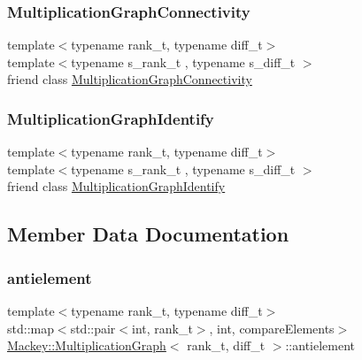 \subsubsection{\texorpdfstring{Multiplication\+Graph\+Connectivity}{MultiplicationGraphConnectivity}}
{\footnotesize\ttfamily template$<$typename rank\+\_\+t, typename diff\+\_\+t$>$ \\
template$<$typename s\+\_\+rank\+\_\+t , typename s\+\_\+diff\+\_\+t $>$ \\
friend class \hyperlink{classMackey_1_1MultiplicationGraphConnectivity}{Multiplication\+Graph\+Connectivity}\hspace{0.3cm}{\ttfamily [friend]}}

\mbox{\label{classMackey_1_1MultiplicationGraph_a3c44ae70fe9249e9662ab525f97dc1db}} 
\subsubsection{\texorpdfstring{Multiplication\+Graph\+Identify}{MultiplicationGraphIdentify}}
{\footnotesize\ttfamily template$<$typename rank\+\_\+t, typename diff\+\_\+t$>$ \\
template$<$typename s\+\_\+rank\+\_\+t , typename s\+\_\+diff\+\_\+t $>$ \\
friend class \hyperlink{classMackey_1_1MultiplicationGraphIdentify}{Multiplication\+Graph\+Identify}\hspace{0.3cm}{\ttfamily [friend]}}



\subsection{Member Data Documentation}
\mbox{\label{classMackey_1_1MultiplicationGraph_a8a0d1354d01f29d4388142aab0248389}} 
\subsubsection{\texorpdfstring{antielement}{antielement}}
{\footnotesize\ttfamily template$<$typename rank\+\_\+t, typename diff\+\_\+t$>$ \\
std\+::map$<$std\+::pair$<$int, rank\+\_\+t$>$, int, compare\+Elements$>$ \hyperlink{classMackey_1_1MultiplicationGraph}{Mackey\+::\+Multiplication\+Graph}$<$ rank\+\_\+t, diff\+\_\+t $>$\+::antielement\hspace{0.3cm}{\ttfamily [protected]}}



